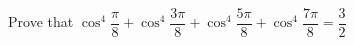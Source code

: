 
%
%
%
%
% 
% 
\question[4] Prove that $\cos^4\dfrac{\pi}{8} + \cos^4\dfrac{3\pi}{8} + \cos^4\dfrac{5\pi}{8} + \cos^4\dfrac{7\pi}{8} = \dfrac{3}{2}$


\ifprintanswers
\fi 

